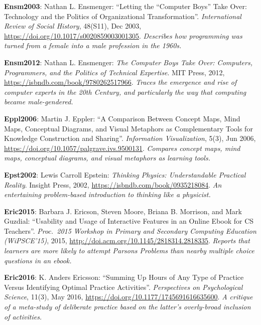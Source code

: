 \textbf{\hypertarget{b:Ensm2003}{Ensm2003}\label{b:Ensm2003}}: Nathan L. Ensmenger: ``Letting the ``Computer Boys'' Take Over: Technology and the Politics of Organizational Transformation''. \emph{International Review of Social History}, 48(S11), Dec 2003, \url{https://doi.org/10.1017/s0020859003001305}. \emph{Describes how programming was turned from a female into a male profession in the 1960s.}

\textbf{\hypertarget{b:Ensm2012}{Ensm2012}\label{b:Ensm2012}}: Nathan L. Ensmenger: \emph{The Computer Boys Take Over: Computers, Programmers, and the Politics of Technical Expertise}. MIT Press, 2012, \url{https://isbndb.com/book/9780262517966}. \emph{Traces the emergence and rise of computer experts in the 20th Century, and particularly the way that computing became male-gendered.}

\textbf{\hypertarget{b:Eppl2006}{Eppl2006}\label{b:Eppl2006}}: Martin J. Eppler: ``A Comparison Between Concept Maps, Mind Maps, Conceptual Diagrams, and Visual Metaphors as Complementary Tools for Knowledge Construction and Sharing''. \emph{Information Visualization}, 5(3), Jun 2006, \url{https://doi.org/10.1057/palgrave.ivs.9500131}. \emph{Compares concept maps, mind maps, conceptual diagrams, and visual metaphors as learning tools.}

\textbf{\hypertarget{b:Epst2002}{Epst2002}\label{b:Epst2002}}: Lewis Carroll Epstein: \emph{Thinking Physics: Understandable Practical Reality}. Insight Press, 2002, \url{https://isbndb.com/book/0935218084}. \emph{An entertaining problem-based introduction to thinking like a physicist.}

\textbf{\hypertarget{b:Eric2015}{Eric2015}\label{b:Eric2015}}: Barbara J. Ericson, Steven Moore, Briana B. Morrison, and Mark Guzdial: ``Usability and Usage of Interactive Features in an Online Ebook for CS Teachers''. \emph{Proc.\ 2015 Workshop in Primary and Secondary Computing Education (WiPSCE'15)}, 2015, \url{http://doi.acm.org/10.1145/2818314.2818335}. \emph{Reports that learners are more likely to attempt Parsons Problems than nearby multiple choice questions in an ebook.}

\textbf{\hypertarget{b:Eric2016}{Eric2016}\label{b:Eric2016}}: K. Anders Ericsson: ``Summing Up Hours of Any Type of Practice Versus Identifying Optimal Practice Activities''. \emph{Perspectives on Psychological Science}, 11(3), May 2016, \url{https://doi.org/10.1177/1745691616635600}. \emph{A critique of a meta-study of deliberate practice based on the latter's overly-broad inclusion of activities.}

